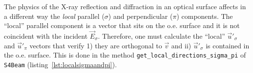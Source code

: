 \documentclass{iucr}
\begin{document}
The physics of the X-ray reflection and diffraction in an optical surface affects in a different way 
the {\it local} parallel ($\sigma$) and perpendicular ($\pi$) components. The ``local'' parallel component
is a vector that sits on the o.e. surface and it is not coincident with the incident $\vec{E}_\sigma$.
Therefore, one must calculate the ``local'' $\vec{u}'_\sigma$ and $\vec{u}'_\pi$ vectors that verify
1) they are orthogonal to $\vec{v}$ and ii) $\vec{u}'_\sigma$ is contained in the o.e. surface. 
This is done in the method {\tt get\_local\_directions\_sigma\_pi} of {\tt S4Beam} (listing~\ref{lst:localsigmaandpi}).





\end{document}
